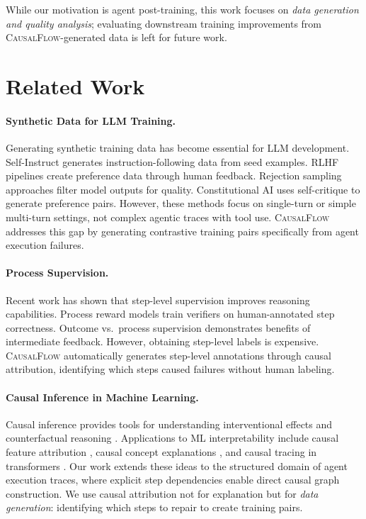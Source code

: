\documentclass{article}
\theoremstyle{plain}
\theoremstyle{definition}
\theoremstyle{remark}
\begin{document}
While our motivation is agent post-training, this work focuses on \emph{data generation and quality analysis}; evaluating downstream training improvements from \textsc{CausalFlow}-generated data is left for future work.


\section{Related Work}

\paragraph{Synthetic Data for LLM Training.}
Generating synthetic training data has become essential for LLM development. Self-Instruct \cite{wang2023selfinstruct} generates instruction-following data from seed examples. RLHF pipelines \cite{ouyang2022training} create preference data through human feedback. Rejection sampling approaches \cite{yuan2023scaling} filter model outputs for quality. Constitutional AI \cite{bai2022constitutional} uses self-critique to generate preference pairs. However, these methods focus on single-turn or simple multi-turn settings, not complex agentic traces with tool use. \textsc{CausalFlow} addresses this gap by generating contrastive training pairs specifically from agent execution failures.

\paragraph{Process Supervision.}
Recent work has shown that step-level supervision improves reasoning capabilities. Process reward models \cite{lightman2023lets} train verifiers on human-annotated step correctness. Outcome vs.\ process supervision \cite{uesato2022solving} demonstrates benefits of intermediate feedback. However, obtaining step-level labels is expensive. \textsc{CausalFlow} automatically generates step-level annotations through causal attribution, identifying which steps caused failures without human labeling.

\paragraph{Causal Inference in Machine Learning.}
Causal inference provides tools for understanding interventional effects and counterfactual reasoning \cite{pearl2009causality,peters2017elements}. Applications to ML interpretability include causal feature attribution \cite{schwab2019cxplain}, causal concept explanations \cite{goyal2019explaining}, and causal tracing in transformers \cite{meng2022locating}. Our work extends these ideas to the structured domain of agent execution traces, where explicit step dependencies enable direct causal graph construction. We use causal attribution not for explanation but for \emph{data generation}: identifying which steps to repair to create training pairs.
\end{document}
